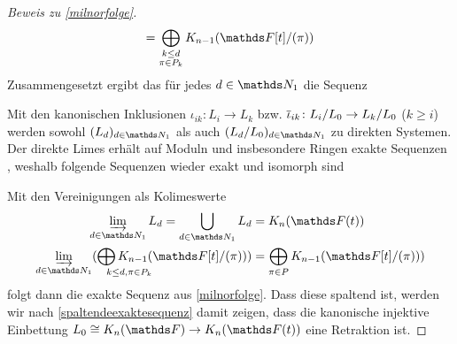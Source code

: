 \documentclass[ngerman,fontsize=11pt, paper=a4, parskip=half, titlepage=true, toc=bib]{scrartcl}
\begin{document}
\begin{proof}[Beweis zu \ref{milnorfolge}]
\begin{align}
    = \bigoplus_{\substack{k\leq d\\\pi\in P_k}}
    \K_{n-1}(\Ftpi)
  \end{align}
  Zusammengesetzt ergibt das für jedes $d\in\N_1$ die Sequenz
  \begin{center}
  \end{center}
  Mit den kanonischen Inklusionen $\iota_{ik}\colon L_i\to L_k$ 
  bzw. $\overline{\iota}_{ik}\colon L_i/L_0\to L_k/L_0$ ($k\geq i$) werden
  sowohl $(L_d)_{d\in\N_1}$ als auch $(L_d/L_0)_{d\in\N_1}$
  zu direkten Systemen.
  Der direkte Limes erhält auf Moduln und insbesondere Ringen exakte
  Sequenzen 
  \cite[siehe][III. §6.2, Prop. 3]{bourbaki},
  weshalb folgende Sequenzen wieder exakt und isomorph sind
  \begin{center}
  \end{center}
  Mit den Vereinigungen als Kolimeswerte
  \begin{align*}
    \varinjlim_{d\in\N_1}L_d
    =\bigcup_{d\in\N_1}L_d
    &=\KnFt\\
    \varinjlim_{d\in\N_1}
      (\bigoplus_{\mathrlap{k\leq d, \pi\in P_k}}
      \K_{n-1}(\Ftpi))
    &=\bigoplus_{\pi\in P}
      \K_{n-1}(\Ftpi))
  \end{align*}
  folgt dann die exakte Sequenz aus \ref{milnorfolge}.
  Dass diese spaltend ist, werden wir nach
  \ref{spaltendeexaktesequenz} damit zeigen, dass
  die kanonische injektive Einbettung $L_0\cong\KnF\to\KnFt$ 
  eine Retraktion ist.


\end{proof}
\end{document}
